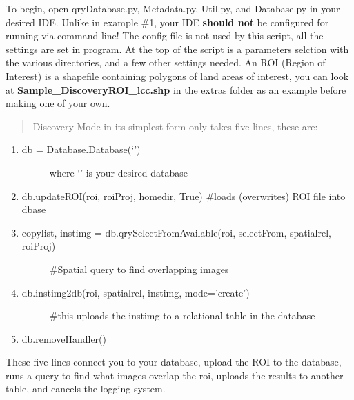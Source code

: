 \documentclass[letterpaper,10pt,openany,oneside]{sphinxmanual}
\begin{document}
To begin, open qryDatabase.py, Metadata.py, Util.py, and Database.py in your
desired IDE. Unlike in example \#1, your IDE \textbf{should not} be configured for running
via command line! The config file is not used by this script, all the settings are set
in program. At the top of the script is a parameters selction with the various directories,
and a few other settings needed. An ROI (Region of Interest) is a shapefile containing
polygons of land areas of interest, you can look at \textbf{Sample\_DiscoveryROI\_lcc.shp} in
the extras folder as an example before making one of your own.
\begin{quote}

Discovery Mode in its simplest form only takes five lines, these are:
\end{quote}
\begin{enumerate}
\item {} \begin{description}
\item[{db = Database.Database(`')}] \leavevmode
where `' is your desired database

\end{description}

\item {} 
db.updateROI(roi, roiProj, homedir, True) \#loads (overwrites) ROI file into dbase

\item {} \begin{description}
\item[{copylist, instimg = db.qrySelectFromAvailable(roi, selectFrom, spatialrel, roiProj)}] \leavevmode
\#Spatial query to find overlapping images

\end{description}

\item {} \begin{description}
\item[{db.instimg2db(roi, spatialrel, instimg, mode='create')}] \leavevmode
\#this uploads the instimg to a relational table in the database

\end{description}

\item {} 
db.removeHandler()

\end{enumerate}

These five lines connect you to your database, upload the ROI to the database,
runs a query to find what images overlap the roi, uploads the results to another table,
and cancels the logging system.
\end{document}
